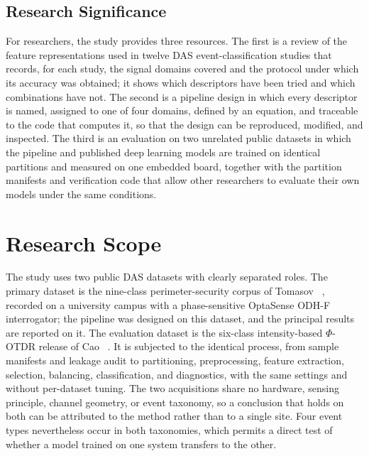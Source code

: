 \subsection{Research Significance}
\label{sec:TheoreticalAdvancements}
For researchers, the study provides three resources. The first is a review of the feature representations used in twelve DAS event-classification studies that records, for each study, the signal domains covered and the protocol under which its accuracy was obtained; it shows which descriptors have been tried and which combinations have not. The second is a pipeline design in which every descriptor is named, assigned to one of four domains, defined by an equation, and traceable to the code that computes it, so that the design can be reproduced, modified, and inspected. The third is an evaluation on two unrelated public datasets in which the pipeline and published deep learning models are trained on identical partitions and measured on one embedded board, together with the partition manifests and verification code that allow other researchers to evaluate their own models under the same conditions.

\section{Research Scope}
\label{sec:ResearchScope}
The study uses two public DAS datasets with clearly separated roles. The primary dataset is the nine-class perimeter-security corpus of Tomasov \etal~\cite{tomasov2025dataset}, recorded on a university campus with a phase-sensitive OptaSense ODH-F interrogator; the pipeline was designed on this dataset, and the principal results are reported on it. The evaluation dataset is the six-class intensity-based $\Phi$-OTDR release of Cao \etal~\cite{caoxin2023opendataset}. It is subjected to the identical process, from sample manifests and leakage audit to partitioning, preprocessing, feature extraction, selection, balancing, classification, and diagnostics, with the same settings and without per-dataset tuning. The two acquisitions share no hardware, sensing principle, channel geometry, or event taxonomy, so a conclusion that holds on both can be attributed to the method rather than to a single site. Four event types nevertheless occur in both taxonomies, which permits a direct test of whether a model trained on one system transfers to the other.

